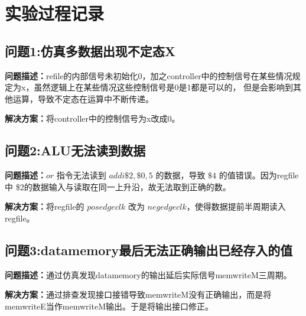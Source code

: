 \section{实验过程记录}
\subsection{问题1:仿真多数据出现不定态X}
\textbf{问题描述：}refile的内部信号未初始化0，加之controller中的控制信号在某些情况规定为x，虽然逻辑上在某些情况这些控制信号是0是1都是可以的，
但是会影响到其他运算，导致不定态在运算中不断传递。

\textbf{解决方案：}将controller中的控制信号为x改成0。
\subsection{问题2:ALU无法读到数据}
\textbf{问题描述：}$or$ 指令无法读到 $addi \$2, \$0, 5$ 的数据，导致 $\$4$ 的值错误。因为regfile中 \$2的数据输入与读取在同一上升沿，故无法取到正确的数。

\textbf{解决方案：}将regfile的 $posedge clk$ 改为 $negedge clk $，使得数据提前半周期读入regfile。
\subsection{问题3:datamemory最后无法正确输出已经存入的值}
\textbf{问题描述：}通过仿真发现datamemory的输出延后实际信号memwriteM三周期。

\textbf{解决方案：}通过排查发现接口接错导致memwriteM没有正确输出，而是将memwriteE当作memwriteM输出。于是将输出接口修正。